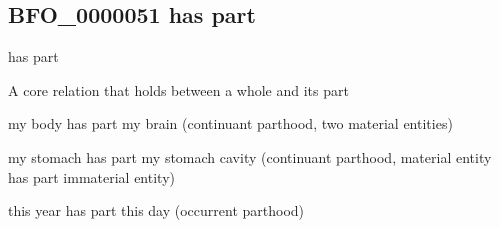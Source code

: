 \documentclass[letterpaper,10pt,english]{sphinxmanual}
\begin{document}
\begin{sphinxShadowBox}

\sphinxAtStartPar
{}
\end{sphinxShadowBox}

\begin{sphinxShadowBox}

\sphinxAtStartPar
{}

\sphinxAtStartPar
{}

\sphinxAtStartPar
{}
\end{sphinxShadowBox}
\begin{quote}

\ignorespaces \end{quote}


\subsection{BFO\_0000051 \sphinxhyphen{} has part}
\label{\detokenize{doc-BFO_0000051:bfo-0000051-has-part}}\label{\detokenize{doc-BFO_0000051:index-0}}\label{\detokenize{doc-BFO_0000051::doc}}
\begin{sphinxShadowBox}

\sphinxAtStartPar
has part
\end{sphinxShadowBox}

\begin{sphinxShadowBox}

\sphinxAtStartPar
{\hyperref[\detokenize{doc-RO_0002131::doc}]{}}
\end{sphinxShadowBox}

\begin{sphinxShadowBox}

\sphinxAtStartPar
A core relation that holds between a whole and its part
\end{sphinxShadowBox}

\begin{sphinxShadowBox}

\sphinxAtStartPar
my body has part my brain (continuant parthood, two material entities)

\sphinxAtStartPar
my stomach has part my stomach cavity (continuant parthood, material entity has part immaterial entity)

\sphinxAtStartPar
this year has part this day (occurrent parthood)
\end{sphinxShadowBox}
\end{document}
